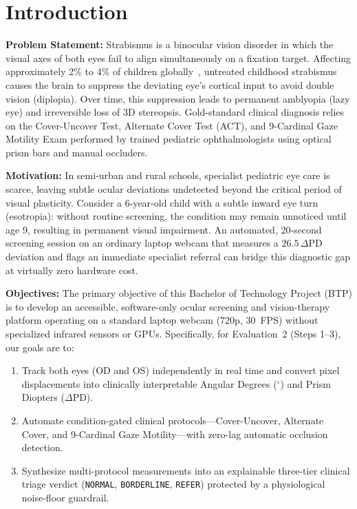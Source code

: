 \documentclass[11pt,a4paper]{article}
\begin{document}
\section{Introduction}
\textbf{Problem Statement:} Strabismus is a binocular vision disorder in which the visual axes of both eyes fail to align simultaneously on a fixation target. Affecting approximately 2\% to 4\% of children globally~\cite{ref1}, untreated childhood strabismus causes the brain to suppress the deviating eye's cortical input to avoid double vision (diplopia). Over time, this suppression leads to permanent amblyopia (lazy eye) and irreversible loss of 3D stereopsis. Gold-standard clinical diagnosis relies on the Cover-Uncover Test, Alternate Cover Test (ACT), and 9-Cardinal Gaze Motility Exam performed by trained pediatric ophthalmologists using optical prism bars and manual occluders.

\textbf{Motivation:} In semi-urban and rural schools, specialist pediatric eye care is scarce, leaving subtle ocular deviations undetected beyond the critical period of visual plasticity. Consider a 6-year-old child with a subtle inward eye turn (esotropia): without routine screening, the condition may remain unnoticed until age 9, resulting in permanent visual impairment. An automated, 20-second screening session on an ordinary laptop webcam that measures a $26.5\,\Delta\text{PD}$ deviation and flags an immediate specialist referral can bridge this diagnostic gap at virtually zero hardware cost.

\textbf{Objectives:} The primary objective of this Bachelor of Technology Project (BTP) is to develop an accessible, software-only ocular screening and vision-therapy platform operating on a standard laptop webcam (720p, 30~FPS) without specialized infrared sensors or GPUs. Specifically, for Evaluation~2 (Steps 1--3), our goals are to:
\begin{enumerate}
    \item Track both eyes (OD and OS) independently in real time and convert pixel displacements into clinically interpretable Angular Degrees ($^\circ$) and Prism Diopters ($\Delta\text{PD}$).
    \item Automate condition-gated clinical protocols---Cover-Uncover, Alternate Cover, and 9-Cardinal Gaze Motility---with zero-lag automatic occlusion detection.
    \item Synthesize multi-protocol measurements into an explainable three-tier clinical triage verdict (\texttt{NORMAL}, \texttt{BORDERLINE}, \texttt{REFER}) protected by a physiological noise-floor guardrail.
\end{enumerate}
\end{document}
